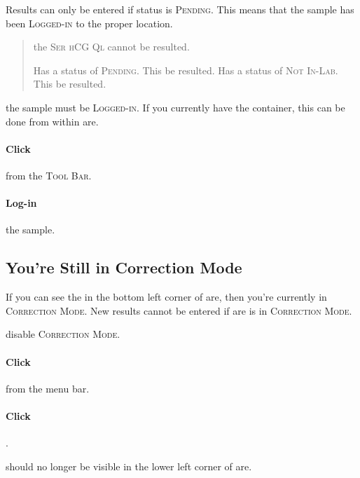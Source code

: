 Results can only be entered if status is \textsc{Pending}. This means that the sample has been \textsc{Logged-in} to the proper location.

\begin{quote}
 the \textsc{Ser hCG Ql} cannot be resulted.\\


\begin{description}
     Has a status of \textsc{Pending}. This  be resulted.
     Has a status of \textsc{Not In-Lab}. This  be resulted.
\end{description}
\end{quote}


 the sample must be \textsc{Logged-in}. If you currently have the container, this can be done from within \gls{are}.

\paragraph{Click}  from the \textsc{Tool Bar}.

\paragraph{Log-in} the sample.


\subsection{You're Still in Correction Mode}

If you can see the  in the bottom left corner of \gls{are}, then you're currently in \textsc{Correction Mode}. New results cannot be entered if \gls{are} is in \textsc{Correction Mode}.

 disable \textsc{Correction Mode}.

\paragraph{Click}  from the menu bar.

\paragraph{Click} .\\


  should no longer be visible in the lower left corner of \gls{are}.
